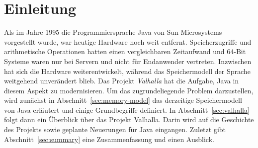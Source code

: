 \section{Einleitung}\label{sec:introduction}

Als im Jahre 1995 die Programmiersprache Java von Sun Microsystems vorgestellt wurde, war heutige Hardware noch weit entfernt.
Speicherzugriffe und arithmetische Operationen hatten einen vergleichbaren Zeitaufwand und 64-Bit Systeme waren nur bei Servern und nicht für Endanwender vertreten.
Inzwischen hat sich die Hardware weiterentwickelt, während das Speichermodell der Sprache weitgehend unverändert blieb.
Das Projekt \emph{Valhalla} hat die Aufgabe, Java in diesem Aspekt zu modernisieren.
Um das zugrundeliegende Problem darzustellen, wird zunächst in Abschnitt~\ref{sec:memory-model} das derzeitige Speichermodell von Java erläutert und einige Grundbegriffe definiert.
In Abschnitt~\ref{sec:valhalla} folgt dann ein Überblick über das Projekt Valhalla.
Darin wird auf die Geschichte des Projekts sowie geplante Neuerungen für Java eingangen.
Zuletzt gibt Abschnitt~\ref{sec:summary} eine Zusammenfassung und einen Ausblick.
